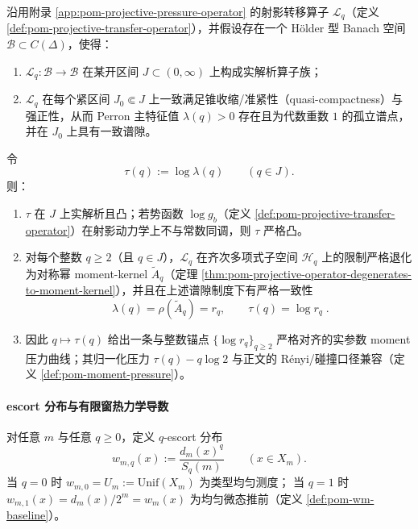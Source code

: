 \begin{theorem}\label{thm:pom-real-q-pressure-analytic-interpolation}
沿用附录 \ref{app:pom-projective-pressure-operator} 的射影转移算子 \(\mathcal{L}_q\)（定义 \ref{def:pom-projective-transfer-operator}），并假设存在一个 Hölder 型 Banach 空间 \(\mathcal{B}\subset C(\Delta)\)，使得：
\begin{enumerate}
  \item \(\mathcal{L}_q:\mathcal{B}\to\mathcal{B}\) 在某开区间 \(J\subset(0,\infty)\) 上构成实解析算子族；
  \item \(\mathcal{L}_q\) 在每个紧区间 \(J_0\Subset J\) 上一致满足锥收缩/准紧性（quasi-compactness）与强正性，从而 Perron 主特征值 \(\lambda(q)>0\) 存在且为代数重数 \(1\) 的孤立谱点，并在 \(J_0\) 上具有一致谱隙。
\end{enumerate}
令
\[
\tau(q):=\log\lambda(q)\qquad(q\in J).
\]
则：
\begin{enumerate}
  \item \(\tau\) 在 \(J\) 上实解析且凸；若势函数 \(\log g_b\)（定义 \ref{def:pom-projective-transfer-operator}）在射影动力学上不与常数同调，则 \(\tau\) 严格凸。
  \item 对每个整数 \(q\ge 2\)（且 \(q\in J\)），\(\mathcal{L}_q\) 在齐次多项式子空间 \(\mathcal{H}_q\) 上的限制严格退化为对称幂 moment-kernel \(\widetilde A_q\)（定理 \ref{thm:pom-projective-operator-degenerates-to-moment-kernel}），并且在上述谱隙制度下有严格一致性
  \[
  \boxed{\;
  \lambda(q)=\rho(\widetilde A_q)=r_q,\qquad \tau(q)=\log r_q\; }.
  \]
  \item 因此 \(q\mapsto \tau(q)\) 给出一条与整数锚点 \(\{\log r_q\}_{q\ge 2}\) 严格对齐的实参数 moment 压力曲线；其归一化压力 \(\tau(q)-q\log 2\) 与正文的 R\'enyi/碰撞口径兼容（定义 \ref{def:pom-moment-pressure}）。
\end{enumerate}
\end{theorem}



\paragraph{escort 分布与有限窗热力学导数}
对任意 \(m\) 与任意 \(q\ge 0\)，定义 \(q\)-escort 分布
\[
w_{m,q}(x):=\frac{d_m(x)^q}{S_q(m)}\qquad(x\in X_m).
\]
当 \(q=0\) 时 \(w_{m,0}=U_m:=\mathrm{Unif}(X_m)\) 为类型均匀测度；
当 \(q=1\) 时 \(w_{m,1}(x)=d_m(x)/2^m=w_m(x)\) 为均匀微态推前（定义 \ref{def:pom-wm-baseline}）。


